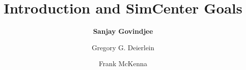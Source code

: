 %
%
%


%
%
%
%
%
%
%
%

\title{Introduction and SimCenter Goals}
\author{
    \textbf{Sanjay Govindjee}
    \and Gregory G. Deierlein
    \and Frank McKenna}
\tocauthor{}
%
%
\maketitle

